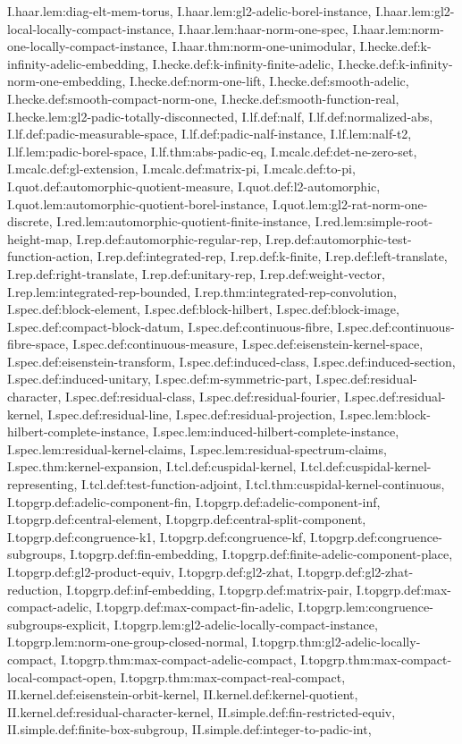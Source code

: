\begin{theorem}
I.haar.lem:diag-elt-mem-torus, I.haar.lem:gl2-adelic-borel-instance, I.haar.lem:gl2-local-locally-compact-instance, I.haar.lem:haar-norm-one-spec, I.haar.lem:norm-one-locally-compact-instance, I.haar.thm:norm-one-unimodular, I.hecke.def:k-infinity-adelic-embedding, I.hecke.def:k-infinity-finite-adelic, I.hecke.def:k-infinity-norm-one-embedding, I.hecke.def:norm-one-lift, I.hecke.def:smooth-adelic, I.hecke.def:smooth-compact-norm-one, I.hecke.def:smooth-function-real, I.hecke.lem:gl2-padic-totally-disconnected, I.lf.def:nalf, I.lf.def:normalized-abs, I.lf.def:padic-measurable-space, I.lf.def:padic-nalf-instance, I.lf.lem:nalf-t2, I.lf.lem:padic-borel-space, I.lf.thm:abs-padic-eq, I.mcalc.def:det-ne-zero-set, I.mcalc.def:gl-extension, I.mcalc.def:matrix-pi, I.mcalc.def:to-pi, I.quot.def:automorphic-quotient-measure, I.quot.def:l2-automorphic, I.quot.lem:automorphic-quotient-borel-instance, I.quot.lem:gl2-rat-norm-one-discrete, I.red.lem:automorphic-quotient-finite-instance, I.red.lem:simple-root-height-map, I.rep.def:automorphic-regular-rep, I.rep.def:automorphic-test-function-action, I.rep.def:integrated-rep, I.rep.def:k-finite, I.rep.def:left-translate, I.rep.def:right-translate, I.rep.def:unitary-rep, I.rep.def:weight-vector, I.rep.lem:integrated-rep-bounded, I.rep.thm:integrated-rep-convolution, I.spec.def:block-element, I.spec.def:block-hilbert, I.spec.def:block-image, I.spec.def:compact-block-datum, I.spec.def:continuous-fibre, I.spec.def:continuous-fibre-space, I.spec.def:continuous-measure, I.spec.def:eisenstein-kernel-space, I.spec.def:eisenstein-transform, I.spec.def:induced-class, I.spec.def:induced-section, I.spec.def:induced-unitary, I.spec.def:m-symmetric-part, I.spec.def:residual-character, I.spec.def:residual-class, I.spec.def:residual-fourier, I.spec.def:residual-kernel, I.spec.def:residual-line, I.spec.def:residual-projection, I.spec.lem:block-hilbert-complete-instance, I.spec.lem:induced-hilbert-complete-instance, I.spec.lem:residual-kernel-claims, I.spec.lem:residual-spectrum-claims, I.spec.thm:kernel-expansion, I.tcl.def:cuspidal-kernel, I.tcl.def:cuspidal-kernel-representing, I.tcl.def:test-function-adjoint, I.tcl.thm:cuspidal-kernel-continuous, I.topgrp.def:adelic-component-fin, I.topgrp.def:adelic-component-inf, I.topgrp.def:central-element, I.topgrp.def:central-split-component, I.topgrp.def:congruence-k1, I.topgrp.def:congruence-kf, I.topgrp.def:congruence-subgroups, I.topgrp.def:fin-embedding, I.topgrp.def:finite-adelic-component-place, I.topgrp.def:gl2-product-equiv, I.topgrp.def:gl2-zhat, I.topgrp.def:gl2-zhat-reduction, I.topgrp.def:inf-embedding, I.topgrp.def:matrix-pair, I.topgrp.def:max-compact-adelic, I.topgrp.def:max-compact-fin-adelic, I.topgrp.lem:congruence-subgroups-explicit, I.topgrp.lem:gl2-adelic-locally-compact-instance, I.topgrp.lem:norm-one-group-closed-normal, I.topgrp.thm:gl2-adelic-locally-compact, I.topgrp.thm:max-compact-adelic-compact, I.topgrp.thm:max-compact-local-compact-open, I.topgrp.thm:max-compact-real-compact, II.kernel.def:eisenstein-orbit-kernel, II.kernel.def:kernel-quotient, II.kernel.def:residual-character-kernel, II.simple.def:fin-restricted-equiv, II.simple.def:finite-box-subgroup, II.simple.def:integer-to-padic-int, 
\end{theorem}
